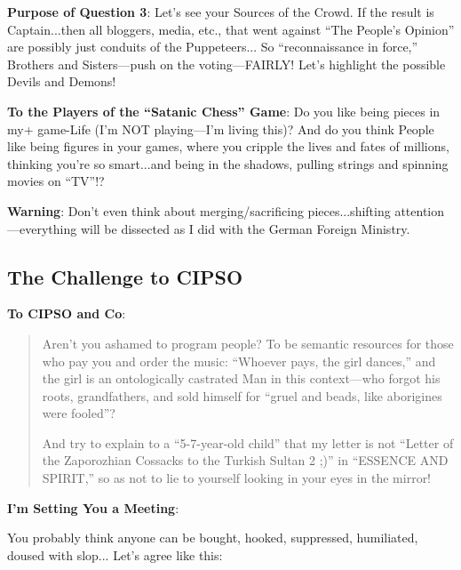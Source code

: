 \documentclass[11pt,a4paper]{article}
\theoremstyle{definition}
\theoremstyle{remark}
\begin{document}
\textbf{Purpose of Question 3}: Let's see your Sources of the Crowd. If the result is Captain...then all bloggers, media, etc., that went against ``The People's Opinion'' are possibly just conduits of the Puppeteers... So ``reconnaissance in force,'' Brothers and Sisters—push on the voting—FAIRLY! Let's highlight the possible Devils and Demons!

\textbf{To the Players of the ``Satanic Chess'' Game}: Do you like being pieces in my+ game-Life (I'm NOT playing—I'm living this)? And do you think People like being figures in your games, where you cripple the lives and fates of millions, thinking you're so smart...and being in the shadows, pulling strings and spinning movies on ``TV''!?

\textbf{Warning}: Don't even think about merging/sacrificing pieces...shifting attention—everything will be dissected as I did with the German Foreign Ministry.

\subsection{The Challenge to CIPSO}

\textbf{To CIPSO and Co}:

\begin{quote}
Aren't you ashamed to program people? To be semantic resources for those who pay you and order the music: ``Whoever pays, the girl dances,'' and the girl is an ontologically castrated Man in this context—who forgot his roots, grandfathers, and sold himself for ``gruel and beads, like aborigines were fooled''?

And try to explain to a ``5-7-year-old child'' that my letter is not ``Letter of the Zaporozhian Cossacks to the Turkish Sultan 2 ;)'' in ``ESSENCE AND SPIRIT,'' so as not to lie to yourself looking in your eyes in the mirror!
\end{quote}

\textbf{I'm Setting You a Meeting}:

You probably think anyone can be bought, hooked, suppressed, humiliated, doused with slop... Let's agree like this:

\begin{center}
\end{center}
\end{document}
